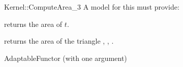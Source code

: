 \begin{ccRefFunctionObjectConcept}{Kernel::ComputeArea_3}
A model for this must provide:


       {returns the area of $t$. }

{returns the area of the triangle , , . }

\ccRefines
AdaptableFunctor (with one argument)

\ccSeeAlso
{}\\

\end{ccRefFunctionObjectConcept}
